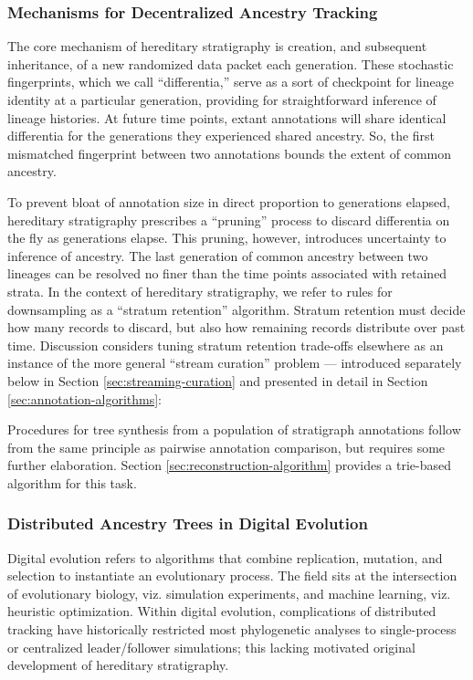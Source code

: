 \subsubsection{Mechanisms for Decentralized Ancestry Tracking}

The core mechanism of hereditary stratigraphy is creation, and subsequent inheritance, of a new randomized data packet each generation.
These stochastic fingerprints, which we call ``differentia,'' serve as a sort of checkpoint for lineage identity at a particular generation, providing for straightforward inference of lineage histories.
At future time points, extant annotations will share identical differentia for the generations they experienced shared ancestry.
So, the first mismatched fingerprint between two annotations bounds the extent of common ancestry.

To prevent bloat of annotation size in direct proportion to generations elapsed, hereditary stratigraphy prescribes a ``pruning'' process to discard   differentia on the fly as generations elapse.
This pruning, however, introduces uncertainty to inference of ancestry.
The last generation of common ancestry between two lineages can be resolved no finer than the time points associated with retained strata.
In the context of hereditary stratigraphy, we refer to rules for downsampling as a ``stratum retention'' algorithm.
Stratum retention must decide how many records to discard, but also how remaining records distribute over past time.
Discussion considers tuning stratum retention trade-offs elsewhere as an instance of the more general ``stream curation'' problem --- introduced separately below in Section \ref{sec:streaming-curation} and presented in detail in Section \ref{sec:annotation-algorithms}:

Procedures for tree synthesis from a population of stratigraph annotations follow from the same principle as pairwise annotation comparison, but requires some further elaboration.
Section \ref{sec:reconstruction-algorithm} provides a trie-based algorithm for this task.

\subsubsection{Distributed Ancestry Trees in Digital Evolution}

Digital evolution refers to algorithms that combine replication, mutation, and selection to instantiate an evolutionary process.
The field sits at the intersection of evolutionary biology, viz. simulation experiments, and machine learning, viz. heuristic optimization.
Within digital evolution, complications of distributed tracking have historically restricted most phylogenetic analyses to single-process or centralized leader/follower simulations; this lacking motivated original development of hereditary stratigraphy.

